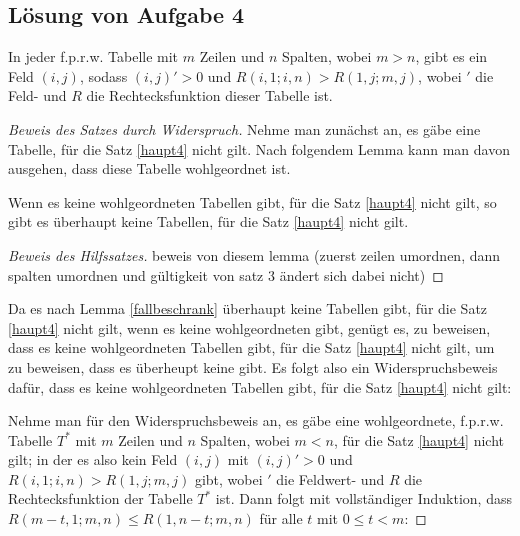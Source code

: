 \subsection*{Lösung von Aufgabe 4}

\begin{thm}\label{haupt4}
    In jeder f.p.r.w. Tabelle mit $m$ Zeilen und $n$ Spalten, wobei $m>n$, gibt es ein Feld $(i, j)$, sodass 
    $(i, j)'>0$ und $R(i, 1; i, n) > R(1, j; m, j)$, wobei $'$ die Feld- und $R$ die Rechtecksfunktion dieser 
    Tabelle ist.
\end{thm}

\begin{proof}[Beweis des Satzes durch Widerspruch]
    Nehme man zunächst an, es gäbe eine Tabelle, für die Satz \ref{haupt4} nicht gilt. Nach folgendem Lemma kann man 
    davon ausgehen, dass diese Tabelle wohlgeordnet ist.
    \begin{lem}\label{fallbeschrank}
        Wenn es keine wohlgeordneten Tabellen gibt, für die Satz \ref{haupt4} nicht gilt, so gibt es überhaupt keine 
        Tabellen, für die Satz \ref{haupt4} nicht gilt.
    \end{lem}
    \begin{proof}[Beweis des Hilfssatzes]
        beweis von diesem lemma (zuerst zeilen umordnen, dann spalten umordnen und gültigkeit von satz 3 ändert sich 
        dabei nicht) %
    \end{proof}
    Da es nach Lemma \ref{fallbeschrank} überhaupt keine Tabellen gibt, für die Satz \ref{haupt4} 
    nicht gilt, wenn es keine wohlgeordneten gibt, genügt es, zu beweisen, dass es keine wohlgeordneten Tabellen 
    gibt, für die Satz \ref{haupt4} nicht gilt, um zu beweisen, dass es überheupt keine gibt. Es folgt also ein 
    Widerspruchsbeweis dafür, dass es keine wohlgeordneten Tabellen gibt, für die Satz \ref{haupt4} nicht gilt:

    Nehme man für den Widerspruchsbeweis an, es gäbe eine wohlgeordnete, f.p.r.w. Tabelle $T^*$ mit $m$ Zeilen und $n$ 
    Spalten, wobei $m<n$, für die Satz \ref{haupt4} nicht gilt; in der es also kein Feld $(i, j)$ mit $(i, j)'>0$ 
    und $R(i, 1; i, n)>R(1, j; m, j)$ gibt, wobei $'$ die Feldwert- und $R$ die Rechtecksfunktion der Tabelle $T^*$ 
    ist. Dann folgt mit vollständiger Induktion, dass $R(m-t, 1; m, n)\leq R(1, n-t; m, n)$ für alle $t$ mit $0\leq 
    t<m$:


\end{proof}
